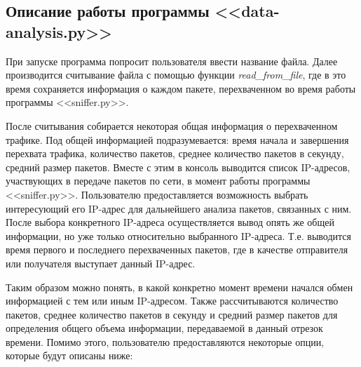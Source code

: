 \documentclass[bachelor, och, coursework]{SCWorks}
\begin{document}
  \subsection{Описание работы программы <<data-analysis.py>>}

  При запуске программа попросит пользователя ввести название файла. Далее производится считывание файла с помощью функции \textit{read\_from\_file},
  где в это время сохраняется информация о каждом пакете, перехваченном во время работы программы <<sniffer.py>>.

  После считывания собирается некоторая общая информация о перехваченном трафике. Под общей информацией подразумевается: время начала и завершения
  перехвата трафика, количество пакетов, среднее количество пакетов в секунду, средний размер пакетов. Вместе с этим в консоль выводится список 
  IP-адресов, участвующих в передаче пакетов по сети, в момент работы программы <<sniffer.py>>. Пользователю предоставляется возможность выбрать
  интересующий его IP-адрес для дальнейшего анализа пакетов, связанных с ним. После выбора конкретного IP-адреса осуществляется вывод опять же общей
  информации, но уже только относительно выбранного IP-адреса. Т.е. выводится время первого и последнего перехваченных пакетов, где в качестве отправителя
  или получателя выступает данный IP-адрес. 
  
  Таким образом можно понять, в какой конкретно момент времени начался обмен информацией с тем или иным 
  IP-адресом. Также рассчитываются количество пакетов, среднее количество пакетов в секунду и средний размер пакетов для определения общего объема 
  информации, передаваемой в данный отрезок времени. Помимо этого, пользователю предоставляются некоторые опции, которые будут описаны ниже:
  
\end{document}
